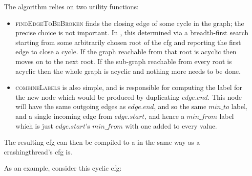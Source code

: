 The algorithm relies on two utility functions:
\begin{itemize}
\item \textsc{findEdgeToBeBroken} finds the closing edge of some cycle
  in the graph; the precise choice is not important.  In
  {\implementation}, this determined via a breadth-first search
  starting from some arbitrarily chosen root of the \gls{cfg} and
  reporting the first edge to close a cycle.  If the graph reachable
  from that root is acyclic then {\implementation} moves on to the
  next root.  If the sub-graph reachable from every root is acyclic
  then the whole graph is acyclic and nothing more needs to be done.
\item \textsc{combineLabels} is also simple, and is responsible for
  computing the label for the new node which would be produced by
  duplicating $\mathit{edge}.\mathit{end}$.  This node will have the
  same outgoing edges as $\mathit{edge}.\mathit{end}$, and so the same
  $min\_to$ label, and a single incoming edge from
  $\mathit{edge}.\mathit{start}$, and hence a $\mathit{min\_from}$
  label which is just $\mathit{edge}.\mathit{start}$'s
  $\mathit{min\_from}$ with one added to every value.
\end{itemize}
The resulting \gls{cfg} can then be compiled to a {\StateMachine} in
the same way as a \gls{crashingthread}'s \gls{cfg} is.

As an example, consider this cyclic \gls{cfg}:

